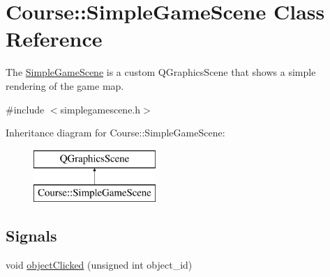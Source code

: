 \hypertarget{classCourse_1_1SimpleGameScene}{\section{Course\-:\-:Simple\-Game\-Scene Class Reference}
\label{classCourse_1_1SimpleGameScene}
}


The \hyperlink{classCourse_1_1SimpleGameScene}{Simple\-Game\-Scene} is a custom Q\-Graphics\-Scene that shows a simple rendering of the game map.  




{\ttfamily \#include $<$simplegamescene.\-h$>$}

Inheritance diagram for Course\-:\-:Simple\-Game\-Scene\-:\begin{figure}[H]
\begin{center}
\leavevmode
\includegraphics[height=2.000000cm]{classCourse_1_1SimpleGameScene}
\end{center}
\end{figure}
\subsection*{Signals}
\begin{DoxyCompactItemize}
\item 
void \hyperlink{classCourse_1_1SimpleGameScene_ad589e26e037e1915fc8d4c0f06140a01}{object\-Clicked} (unsigned int object\-\_\-id)
\end{DoxyCompactItemize}
